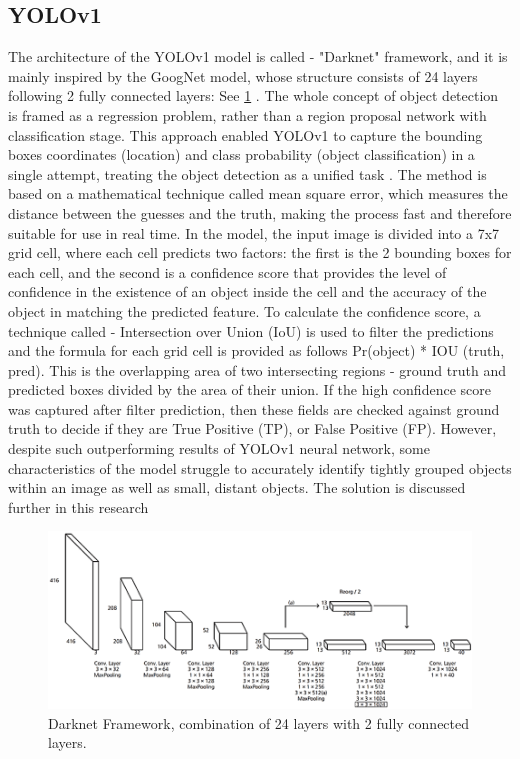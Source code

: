 \begin{multicols}{2}
\subsection{YOLOv1}
The architecture of the YOLOv1 model is called - "Darknet" framework, and it is mainly inspired by the GoogNet model, whose structure consists of 24 layers following 2 fully connected layers: See \ref{fig:Darknet Framework} \citep{redmon2016lookonceunifiedrealtime, Zhou2023}. The whole concept of object detection is framed as a regression problem, rather than a region proposal network with classification stage. This approach enabled YOLOv1 to capture the bounding boxes coordinates (location) and class probability (object classification) in a single attempt, treating the object detection as a unified task \citep{DataCamp2023}. The method is based on a mathematical technique called mean square error, which measures the distance between the guesses and the truth, making the process fast and therefore suitable for use in real time. In the model, the input image is divided into a 7x7 grid cell, where each cell predicts two factors: the first is the 2 bounding boxes for each cell, and the second is a confidence score that provides the level of confidence in the existence of an object inside the cell and the accuracy of the object in matching the predicted feature. To calculate the confidence score, a technique called - Intersection over Union (IoU) is used to filter the predictions and the formula for each grid cell is provided as follows Pr(object) * IOU (truth, pred). This is the overlapping area of two intersecting regions - ground truth and predicted boxes divided by the area of their union. If the high confidence score was captured after filter prediction, then these fields are checked against ground truth to decide if they are True Positive (TP), or False Positive (FP). However, despite such outperforming results of YOLOv1 neural network, some characteristics of the model struggle to accurately identify tightly grouped objects within an image as well as small, distant objects. The solution is discussed further in this research
\end{multicols}

\begin{figure}[ht]
    \centering
    \includegraphics[width=0.9\linewidth]{datas/Darknet Framework.png}
    \caption{Darknet Framework, combination of 24 layers with 2 fully connected layers.}
    \label{fig:Darknet Framework}
\end{figure}

